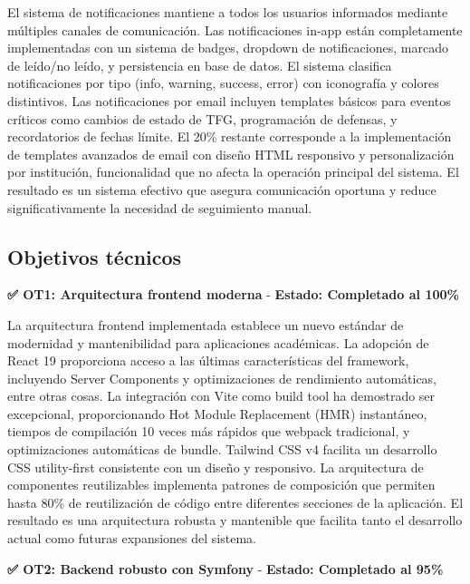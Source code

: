 \documentclass[12pt,a4paper,oneside]{report}
\begin{document}
El sistema de notificaciones mantiene a todos los usuarios informados mediante múltiples canales de comunicación. Las notificaciones in-app están completamente implementadas con un sistema de badges, dropdown de notificaciones, marcado de leído/no leído, y persistencia en base de datos. El sistema clasifica notificaciones por tipo (info, warning, success, error) con iconografía y colores distintivos. Las notificaciones por email incluyen templates básicos para eventos críticos como cambios de estado de TFG, programación de defensas, y recordatorios de fechas límite. El 20\% restante corresponde a la implementación de templates avanzados de email con diseño HTML responsivo y personalización por institución, funcionalidad que no afecta la operación principal del sistema. El resultado es un sistema efectivo que asegura comunicación oportuna y reduce significativamente la necesidad de seguimiento manual.

\subsection{Objetivos técnicos}\label{objetivos-tuxe9cnicos}

\textbf{✅ OT1: Arquitectura frontend moderna} - \textbf{Estado: Completado al 100\%}

La arquitectura frontend implementada establece un nuevo estándar de modernidad y mantenibilidad para aplicaciones académicas. La adopción de React 19 proporciona acceso a las últimas características del framework, incluyendo Server Components y optimizaciones de rendimiento automáticas, entre otras cosas. La integración con Vite como build tool ha demostrado ser excepcional, proporcionando Hot Module Replacement (HMR) instantáneo, tiempos de compilación 10 veces más rápidos que webpack tradicional, y optimizaciones automáticas de bundle. Tailwind CSS v4 facilita un desarrollo CSS utility-first consistente con un diseño y responsivo. La arquitectura de componentes reutilizables implementa patrones de composición que permiten hasta 80\% de reutilización de código entre diferentes secciones de la aplicación. El resultado es una arquitectura robusta y mantenible que facilita tanto el desarrollo actual como futuras expansiones del sistema.

\textbf{✅ OT2: Backend robusto con Symfony} - \textbf{Estado: Completado al 95\%}
\end{document}
